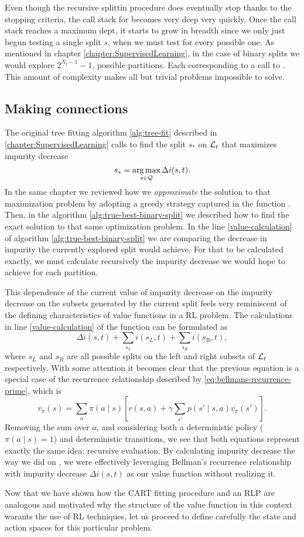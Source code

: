 Even though the recursive splittin procedure does eventually stop thanks to the
stopping criteria, the call stack for \TrueBestSplit becomes very deep very
quickly. Once the call stack reaches a maximum dept, it starts to grow in
breadth since we only just begun testing a single split $s$, when we must test
for every possible one. As mentioned in chapter
\ref{chapter:SupervisedLearning}, in the case of binary splits we would explore
$2^{N_t -1}-1$, possible partitions. Each corresponding to a call to
\TrueBestSplit. This amount of complexity makes all but trivial problems
impossible to solve. 

\subsection{Making connections}

The original tree fitting algorithm \ref{alg:tree-fit} described in
\ref{chapter:SupervisedLearning} calls to find the split $s_*$ on $\mathcal{L}_t$ that
maximizes impurity decrease
\[
    s_* = \operatorname*{arg\,max}_{s \in \mathcal{Q}} \Delta i(s, t).
\]
In the same chapter we reviewed how we \emph{approximate} the solution to that
maximization problem by adopting a greedy strategy captured in the function
\GreedyBestSplit. Then, in the algorithm \ref{alg:true-best-binary-split} we
described how to find the exact solution to that same optimization problem. In
the line \ref{value-calculation} of algorithm \ref{alg:true-best-binary-split}
we are comparing the decrease in impurity the currently explored split would
achieve.  For that to be calculated exactly, we must calculate recursively the
impurity decrease we would hope to achieve for each partition.

This dependence of the current value of impurity decrease on the impurity
decrease on the subsets generated by the current split feels very reminiscent of
the defining characteristics of value functions in a RL problem. The calculations in line \ref{value-calculation} of the function \TrueBestSplit can be formulated as
\[
    \Delta i(s, t) + \sum_{s_L} i(s_L, t) + \sum_{s_R} i(s_R, t),
\]
where $s_L$ and $s_R$ are all possible splits on the left and right subsets of
$\mathcal{L}_t$ respectively. With some attention it becomes clear that the previous
equation is a special case of the recurrence relationship described by
\eqref{eq:bellmans-recurrence-prime}, which is
\[
    v_\pi (s) = \sum_{a} \pi(a \mid s) \left[ r(s,a) + \gamma \sum_{s'} p(s' \mid s, a) v_\pi (s') \right].
\]
Removing the sum over $a$, and considering both a deterministic policy ($\pi(a
\mid s) = 1$) and deterministic transitions, we see that both equations
represent exactly the same idea: recursive evaluation. By calculating impurity
decrease the way we did on \TrueBestSplit, we were effectively leveraging
Bellman's recurrence relationship with impurity decrease $\Delta i(s, t)$ as our
value function without realizing it.

Now that we have shown how the CART fitting procedure and an RLP are analogous
and motivated why the structure of the value function in this context warants
the use of RL techniques, let us proceed to define carefully the state and
action spaces for this particular problem.